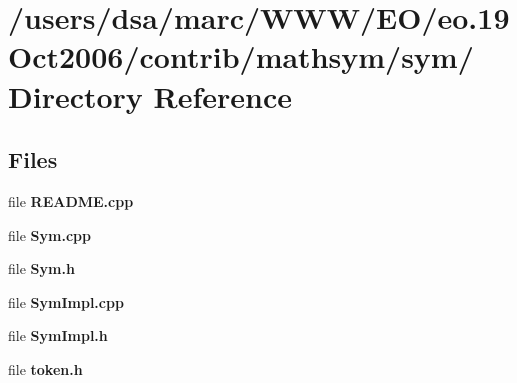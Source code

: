 \section{/users/dsa/marc/WWW/EO/eo.19Oct2006/contrib/mathsym/sym/ Directory Reference}
\label{dir_000028}
\subsection*{Files}
\begin{CompactItemize}
\item 
file {\bf README.cpp}
\item 
file {\bf Sym.cpp}
\item 
file {\bf Sym.h}
\item 
file {\bf SymImpl.cpp}
\item 
file {\bf SymImpl.h}
\item 
file {\bf token.h}
\end{CompactItemize}
